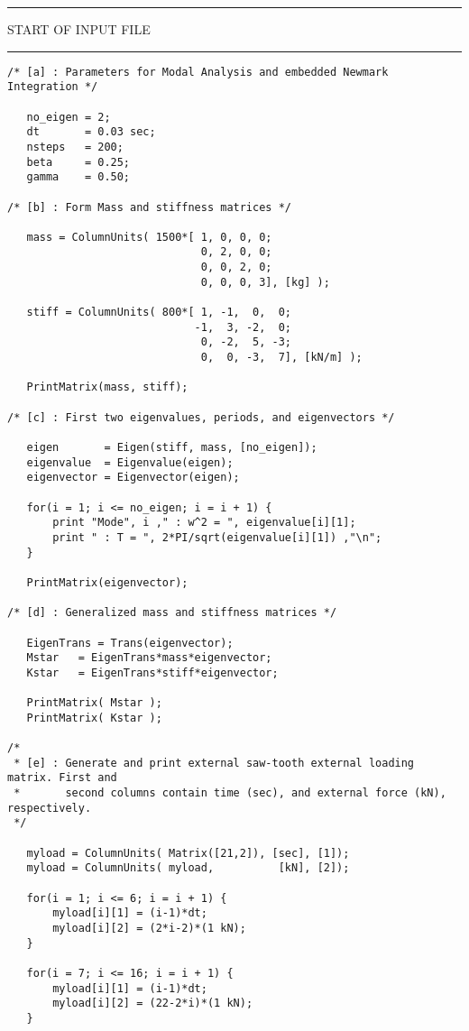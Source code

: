 \vspace{0.20 in}
\begin{footnotesize}
\noindent
{\rule{2.3 in}{0.035 in} START OF INPUT FILE \rule{2.3 in}{0.035 in} }
\begin{verbatim}
/* [a] : Parameters for Modal Analysis and embedded Newmark Integration */

   no_eigen = 2;
   dt       = 0.03 sec;
   nsteps   = 200;
   beta     = 0.25;
   gamma    = 0.50;

/* [b] : Form Mass and stiffness matrices */

   mass = ColumnUnits( 1500*[ 1, 0, 0, 0;
                              0, 2, 0, 0;
                              0, 0, 2, 0;
                              0, 0, 0, 3], [kg] );

   stiff = ColumnUnits( 800*[ 1, -1,  0,  0;
                             -1,  3, -2,  0;
                              0, -2,  5, -3;
                              0,  0, -3,  7], [kN/m] );

   PrintMatrix(mass, stiff);

/* [c] : First two eigenvalues, periods, and eigenvectors */

   eigen       = Eigen(stiff, mass, [no_eigen]);
   eigenvalue  = Eigenvalue(eigen);
   eigenvector = Eigenvector(eigen);

   for(i = 1; i <= no_eigen; i = i + 1) {
       print "Mode", i ," : w^2 = ", eigenvalue[i][1];
       print " : T = ", 2*PI/sqrt(eigenvalue[i][1]) ,"\n";
   }

   PrintMatrix(eigenvector);

/* [d] : Generalized mass and stiffness matrices */

   EigenTrans = Trans(eigenvector);
   Mstar   = EigenTrans*mass*eigenvector;
   Kstar   = EigenTrans*stiff*eigenvector;

   PrintMatrix( Mstar );
   PrintMatrix( Kstar );

/* 
 * [e] : Generate and print external saw-tooth external loading matrix. First and
 *       second columns contain time (sec), and external force (kN), respectively.
 */ 

   myload = ColumnUnits( Matrix([21,2]), [sec], [1]);
   myload = ColumnUnits( myload,          [kN], [2]);

   for(i = 1; i <= 6; i = i + 1) {
       myload[i][1] = (i-1)*dt;
       myload[i][2] = (2*i-2)*(1 kN);
   }

   for(i = 7; i <= 16; i = i + 1) {
       myload[i][1] = (i-1)*dt;
       myload[i][2] = (22-2*i)*(1 kN);
   }


\end{verbatim}
\end{footnotesize}
